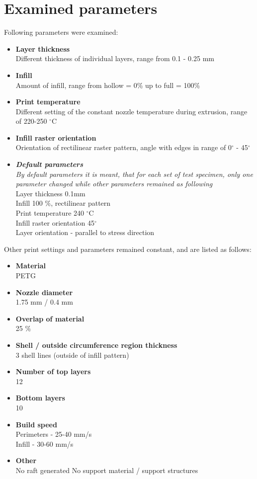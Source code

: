 \documentclass[a4paper, 11pt, reqno]{report}
\begin{document}
\section{Examined parameters}
Following parameters were examined:
\begin{itemize}
\item \textbf{Layer thickness}\\
	Different thickness of individual layers, range from 0.1 - 0.25 mm
\item \textbf{Infill}\\
	Amount of infill, range from hollow = 0\% up to full = 100\%
\item \textbf{Print temperature}\\
	Different setting of the constant nozzle temperature during extrusion, range of 220-250 $^{\circ}$C
\item \textbf{Infill raster orientation}\\
	Orientation of rectilinear raster pattern, angle with edges in range of 0$^{\circ}$ - 45$^{\circ}$
\\
\item \textbf{\textit{Default parameters}}\\
\textit{By default parameters it is meant, that for each set of test specimen, only one parameter changed while other parameters remained as following}\\
Layer thickness 0.1mm\\
Infill 100 \%, rectilinear pattern\\
Print temperature 240 $^{\circ}$C\\
Infill raster orientation 45$^{\circ}$\\
Layer orientation - parallel to stress direction
\end{itemize}
\bigskip
%
Other print settings and parameters remained constant, and are listed as follows:
\begin{itemize}
\item \textbf{Material}\\
	PETG
\item \textbf{Nozzle diameter}\\
	1.75 mm / 0.4 mm
\item \textbf{Overlap of material}\\
	25 \%
\item \textbf{Shell / outside circumference region thickness}\\
	3 shell lines (outside of infill pattern)
\item \textbf{Number of top layers}\\
	12
\item \textbf{Bottom layers}\\
	10
\item \textbf{Build speed}\\
	Perimeters - 25-40 mm/s\\
	Infill - 30-60 mm/s
\item \textbf{Other}\\
	No raft generated
	No support material / support structures
\end{itemize}
\end{document}
